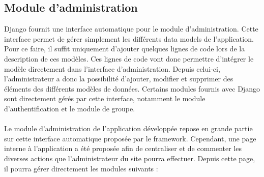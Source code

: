 \documentclass[12pt, a4paper, oneside]{article}
\begin{document}
\subsection{Module d'administration} \label{admin}
    \indent Django fournit une interface automatique pour le module d'administration. Cette interface permet de gérer simplement les différents data models de l'application. Pour ce faire, il suffit uniquement d'ajouter quelques lignes de code lors de la description de ces modèles. Ces lignes de code vont donc permettre d'intégrer le modèle directement dans l'interface d'administration. Depuis celui-ci, l'administrateur a donc la possibilité d'ajouter, modifier et supprimer des éléments des différents modèles de données. Certains modules fournis avec Django sont directement gérés par cette interface, notamment le module d'authentification et le module de groupe.\\\\
    \indent Le module d'administration de l'application développée repose en grande partie sur cette interface automatique proposée par le framework. Cependant, une page interne à l'application a été proposée afin de centraliser et de commenter les diverses actions que l'administrateur du site pourra effectuer. Depuis cette page, il pourra gérer directement les modules suivants :\\
\end{document}
